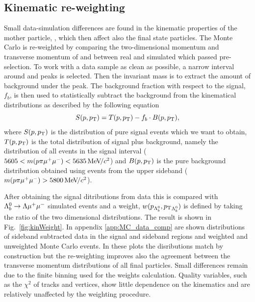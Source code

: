 \subsection{Kinematic re-weighting}
\label{sec:kinWeight}

Small data-simulation differences are found in the kinematic properties of the mother particle, \Lb,
which then affect also the final state particles. The Monte Carlo is re-weighted by 
comparing the two-dimensional momentum and transverse momentum of \Lb and \Lz between
real and simulated \Lb\to\jpsi\Lz which passed pre-selection.
To work with a data sample as clean as possible, a narrow interval around \jpsi and \Lb peaks is selected.
Then the \Lb invariant mass is to extract the amount of background under the peak.
The background fraction with respect to the signal, $f_b$, is then used to statistically
subtract the background from the kinematical distributions as described by the following equation
%
\begin{equation}
S(p,\mbox{$p_{\rm T}$}) = T(p,\mbox{$p_{\rm T}$}) - f_b\cdot B(p,\mbox{$p_{\rm T}$}),
\end{equation}
\noindent
where $S(p,\mbox{$p_{\rm T}$})$ is the distribution of pure signal events which we want to obtain, $T(p,\mbox{$p_{\rm T}$})$ is the total
distribution of signal plus background, namely the distribution of all events in the signal interval
($5605 < m(p\pi\mumu) < 5635 \mevcc$) and $B(p,\mbox{$p_{\rm T}$})$ is the pure background
distribution obtained using events from the upper sideband ($m(p\pi\mumu) > 5800 \mevcc$).

After obtaining the signal ditributions from data this is compared with ${{\Lambda}^0_{b}}\rightarrow{\ensuremath{\Lambda}}{\ensuremath{\mu^+\mu^-}}$ simulated events
and a weight, $w(p_{{{\Lambda}^0_{b}}},\mbox{$p_{\rm T}$}_{{{\Lambda}^0_{b}}})$ is defined by taking the ratio of the two dimensional distributions.
The result is shown in Fig.~\ref{fig:kinWeight}. In appendix \ref{app:MC_data_comp} are shown distributions
of sideband subtracted data in the signal and sideband regions and weighted and unweighted Monte Carlo events.
In these plots the \Lb disributions match by construction but the re-weighting improves also the agreement 
between the transverse momentum distributions of all final particles. Small differences remain due to
the finite binning used for the weights calculation. Quality variables, such as the $\chi^2$ of tracks
and vertices, show little dependence on the kinematics and are relatively unaffected by the weighting procedure.

